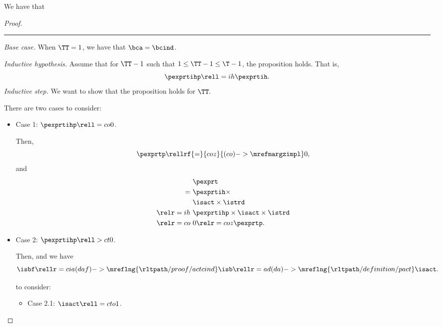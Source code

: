 \begin{proposition}
  We have that %
\end{proposition}

\begin{proof}
  \hrule
  {\it Base case.}
  When $\TT = 1$,
  we have  that
  $\bca = \bcind$.

  \serule
  {\it Inductive hypothesis.}
  Assume that for $\TT - 1$ such that $1 \le \TT - 1 \le \T - 1$,
  the proposition holds. That is,
  $$ \pexprtihp \rell = ih \pexprtih.$$%
  \srule
  {\it Inductive step.}
  We want to show that the proposition holds for $\TT.$

  There are two cases to consider:
  \begin{itemize}
    \item {} Case 1: $\pexprtihp \rell = co 0$. 

      Then,
      $$\pexprtp  \rellrf{=}{coz}{(co)->\mrefmargzimpl} 0,$$
      and
      \begin{align*}
        &\pexprt \\
        =\ &\pexprtih \times \\
        &\isact \times \istrd\\
        \relr = ih \ & \pexprtihp \times \isact \times \istrd \\
        \relr = co \ & 0 \relr = coz \pexprtp.
      \end{align*}
    \item {} Case 2: $\pexprtihp \rell > ct 0$. 

      Then, 
      and we have
      $$\isbf \rellr = cia (daf)->\mreflng{\rltpath/proof/actcind} \isb 
      \rellr = ad (da)->\mreflng{\rltpath/definition/pact} \isact.$$

       to consider:
      \begin{itemize}
        \item {} Case 2.1: $\isact \rell = cto 1$.


\end{itemize}
\end{itemize}
\end{proof}
